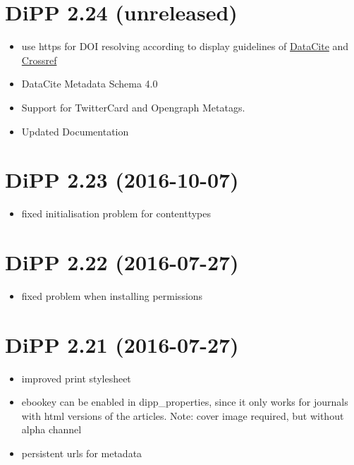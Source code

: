 \documentclass[a4paper,10pt,ngerman]{sphinxmanual}
\begin{document}
\section{DiPP 2.24 (unreleased)}
\label{changelog:dipp-2-24-unreleased}\label{changelog:pep-8}\begin{itemize}
\item {} 
use https for DOI resolving according to display guidelines of
\href{https://support.datacite.org/v1.0/docs/datacite-doi-display-guidelines}{DataCite} and \href{https://www.crossref.org/display-guidelines/}{Crossref}

\item {} 
DataCite Metadata Schema 4.0

\item {} 
Support for TwitterCard and Opengraph Metatags.

\item {} 
Updated Documentation

\end{itemize}


\section{DiPP 2.23 (2016-10-07)}
\label{changelog:dipp-2-23-2016-10-07}\label{changelog:crossref}\begin{itemize}
\item {} 
fixed initialisation problem for contenttypes

\end{itemize}


\section{DiPP 2.22 (2016-07-27)}
\label{changelog:dipp-2-22-2016-07-27}\begin{itemize}
\item {} 
fixed problem when installing permissions

\end{itemize}


\section{DiPP 2.21 (2016-07-27)}
\label{changelog:dipp-2-21-2016-07-27}\begin{itemize}
\item {} 
improved print stylesheet

\item {} 
ebookey can be enabled in dipp\_properties, since it only works for journals
with html versions of the articles. Note: cover image required, but without
alpha channel

\item {} 
persistent urls for metadata

\end{itemize}
\end{document}
